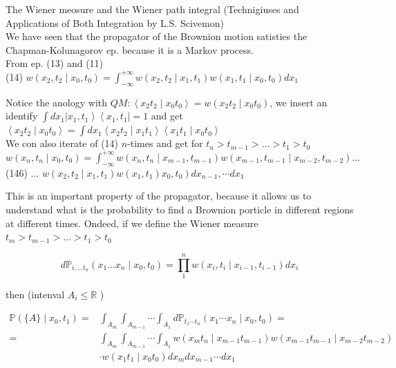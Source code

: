 \documentclass[10pt]{article}
\begin{document}
The Wiener meosure and the Wiener path integral (Technigiuses and Applications of Both Integration by L.S. Scivemon)\\
We have seen that the propagator of the Brownion motion satisties the Chapman-Kolunagorov ep. because it is a Markov process.\\
From ep. (13) and (11)\\
(14) $w\left(x_{2}, t_{2} \mid x_{0}, t_{0}\right)=\int_{-\infty}^{+\infty} w\left(x_{2}, t_{2} \mid x_{1}, t_{1}\right) w\left(x_{1}, t_{1} \mid x_{0}, t_{0}\right) d x_{1}$

Notice the anology with $Q M:\left\langle x_{2} t_{2} \mid x_{0} t_{0}\right\rangle=w\left(x_{2} t_{2} \mid x_{0} t_{0}\right)$, we insert an identify $\int d x_{1}\left|x_{1}, t_{1}\right\rangle\left\langle x_{1}, t_{1}\right|=1$ and get $\left\langle x_{2} t_{2} \mid x_{0} t_{0}\right\rangle=\int d x_{1}\left\langle x_{2} t_{2} \mid x_{1} t_{1}\right\rangle\left\langle x_{1} t_{1} \mid x_{0} t_{0}\right\rangle$\\
We con also iterate of (14) $n$-times and get for $t_{n}>t_{m-1}>\ldots>t_{1}>t_{0}$\\
$w\left(x_{n}, t_{n} \mid x_{0}, t_{0}\right)=\int_{-\infty}^{+\infty} w\left(x_{n}, t_{n} \mid x_{m-1}, t_{m-1}\right) w\left(x_{m-1}, t_{m-1} \mid x_{m-2}, t_{m-2}\right) \ldots$\\
(146) ... $\left.w\left(x_{2}, t_{2} \mid x_{1}, t_{1}\right) w\left(x_{1}, t_{1}\right) x_{0}, t_{0}\right) d x_{n-1}, \cdots d x_{1}$

This is an important property of the propagator, because it allows us to understand what is the probability to find a Brownion porticle in different regions at different times. Ondeed, if we define the Wiener measure $t_{m}>t_{m-1}>\ldots>t_{1}>t_{0}$

$$
d \mathbb{P}_{i, \ldots t_{n}}\left(x_{1} \ldots x_{n} \mid x_{0}, t_{0}\right)=\prod_{1}^{n} w\left(x_{i}, t_{i} \mid x_{i-1}, t_{i-1}\right) d x_{i}
$$

then (intenval $A_{i} \leq \mathbb{R}$ )


\begin{align*}
\mathbb{P}\left(\{A\} \mid x_{0}, t_{1}\right)= & \int_{A_{m}} \int_{A_{m-1}} \cdots \int_{A_{1}} d \mathbb{P}_{t_{1} \cdots t_{n}}\left(x_{1} \cdots x_{n} \mid x_{0}, t_{0}\right)=  \tag{15}\\
= & \int_{A_{m}} \int_{A_{m-1}} \cdots \int_{A_{1}} w\left(x_{m} t_{n} \mid x_{m-1} t_{m-1}\right) w\left(x_{m-1} t_{m-1} \mid x_{m-2} t_{m-2}\right) \\
& \cdot w\left(x_{1} t_{1} \mid x_{0} t_{0}\right) d x_{m} d x_{m-1} \cdots d x_{1}
\end{align*}
\end{document}
